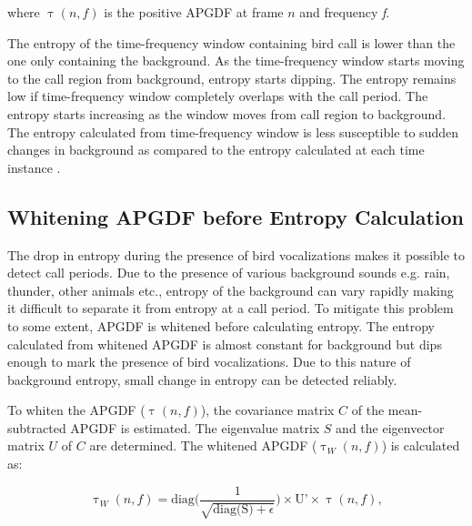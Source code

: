 \documentclass[a4paper]{article}
\begin{document}
where $\uptau(n,f)$ is the positive APGDF at frame $n$ and frequency  \textit{f}.

The entropy of the time-frequency window containing bird call is lower than the one only containing the background. As the time-frequency window starts moving to the call region from background, entropy starts dipping. The entropy remains low if time-frequency window completely overlaps with the call period. The entropy starts increasing as the window moves from call region to background. The entropy calculated from time-frequency window is less susceptible to sudden changes in background as compared to the entropy calculated at each time instance \cite{wang2013}.




 


\subsection{Whitening APGDF before Entropy Calculation}

The drop in entropy during the presence of bird vocalizations makes it possible to detect call periods. Due to the presence of various background sounds e.g. rain, thunder, other animals etc., entropy of the background can  vary rapidly making it difficult to separate it from entropy  at a call period. To mitigate this problem to some extent, APGDF is whitened  before calculating entropy. The entropy calculated from whitened APGDF  is almost constant for background but dips enough to mark the presence of bird vocalizations. Due to this nature of background entropy, small change in entropy can be detected reliably.

To whiten the APGDF ($\uptau(n,f)$), the covariance matrix $C$ of the mean-subtracted
APGDF is estimated. The eigenvalue matrix $S$ and the eigenvector matrix
$U$ of $C$ are determined. The whitened APGDF
($\uptau_W(n,f)$) is calculated as:

\begin{equation}
\uptau_W(n,f)=\text{diag} \bigg(  \frac{1}{\sqrt{\text{diag(S)}+\epsilon}} \bigg )\times \text{U'} \times \uptau(n,f),
\end{equation}
\end{document}
